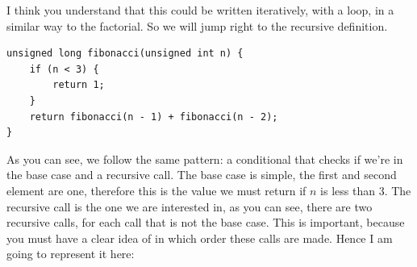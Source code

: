 \documentclass[a4paper]{article}
\begin{document}
I think you understand that this could be written iteratively, with a loop, in
a similar way to the factorial. So we will jump right to the recursive
definition.

\noindent
\begin{minipage}[H]{\linewidth}
\mbox{}
\begin{lstlisting}[style=C, caption={Function to calculate Fibonacci succession},
label={lst:funFibonacci}]
unsigned long fibonacci(unsigned int n) {
    if (n < 3) {
        return 1;
    }
    return fibonacci(n - 1) + fibonacci(n - 2);
}
\end{lstlisting}
\end{minipage}

As you can see, we follow the same pattern: a conditional that checks if we're
in the base case and a recursive call. The base case is simple, the first and
second element are one, therefore this is the value we must return if $n$ is
less than 3. The recursive call is the one we are interested in, as you can see,
there are two recursive calls, for each call that is not the base case. This is
important, because you must have a clear idea of in which order these calls are
made. Hence I am going to represent it here:
\end{document}
